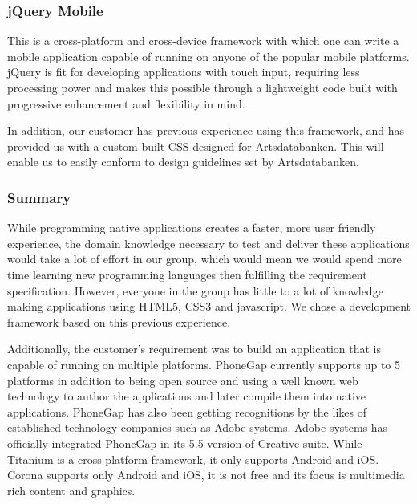 \subsubsection{jQuery Mobile}
This is a cross-platform and cross-device framework with which one can write
a mobile application capable of running on anyone of the popular mobile platforms.
jQuery is fit for developing applications with touch input, requiring
less processing power and  makes this possible through a lightweight code
built with progressive enhancement and flexibility in mind.

In addition, our customer has previous experience using this framework, and has provided us with a custom built CSS designed for Artsdatabanken. This will enable us to easily conform to design guidelines set by Artsdatabanken.

\subsubsection{Summary}
While programming native applications creates a faster, more user friendly experience, the domain knowledge necessary to test and deliver these applications would take a lot of effort in our group, which would mean we would spend more time learning new programming languages then fulfilling the requirement specification. However, everyone in the group has little to a lot of knowledge making applications using HTML5, CSS3 and javascript. We chose a development framework based on this previous experience. 

Additionally, the customer's requirement was to build an application that is capable of running on multiple platforms. PhoneGap currently supports up to 5 platforms in addition to being open source and using a well known web technology to author the applications and later compile them into native applications. PhoneGap has also been getting recognitions by the likes of established technology companies such as Adobe systems.  Adobe systems has officially integrated PhoneGap in its 5.5 version of Creative suite. While Titanium is a cross platform framework, it only supports Android and iOS. Corona supports only Android and iOS, it is not free and its focus is multimedia rich content and graphics.

 

